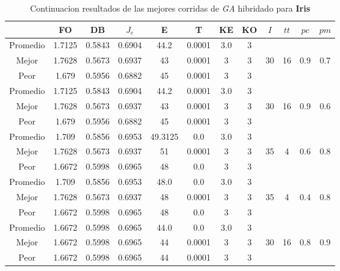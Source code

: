 \begin{table}[h!]
    \footnotesize
    \begin{center}
        \begin{tabular}{|c|c|c|c|c|c|c|c|c|c|c|c|}
        \hline
            & {\bf FO} & {\bf DB} & $J_e$ & {\bf E} & {\bf T} & {\bf KE} & {\bf KO} & $I$ & $tt$ & $pc$ & $pm$ \\
        \hline
        \hline
            Promedio  & 1.7125 & 0.5843 & 0.6904 & 44.2 & 0.0001 & 3.0 & 3 &  &  &  & \\
            \cline{1-8}
            Mejor & 1.7628 & 0.5673  & 0.6937 & 43 & 0.0001 & 3 & 3 & 30 & 16 & 0.9 & 0.7\\
            \cline{1-8}
            Peor & 1.679 & 0.5956  & 0.6882 & 45 & 0.0001 & 3 & 3 &  &  &  & \\
        \hline
        \hline
            Promedio  & 1.7125 & 0.5843 & 0.6904 & 44.2 & 0.0001 & 3.0 & 3 &  &  &  & \\
            \cline{1-8}
            Mejor & 1.7628 & 0.5673  & 0.6937 & 43 & 0.0001 & 3 & 3 & 30 & 16 & 0.9 & 0.6\\
            \cline{1-8}
            Peor & 1.679 & 0.5956  & 0.6882 & 45 & 0.0001 & 3 & 3 &  &  &  & \\
        \hline
        \hline
            Promedio  & 1.709 & 0.5856 & 0.6953 & 49.3125 & 0.0 & 3.0 & 3 &  &  &  & \\
            \cline{1-8}
            Mejor & 1.7628 & 0.5673  & 0.6937 & 51 & 0.0001 & 3 & 3 & 35 & 4 & 0.6 & 0.8\\
            \cline{1-8}
            Peor & 1.6672 & 0.5998  & 0.6965 & 48 & 0.0 & 3 & 3 &  &  &  & \\
        \hline
        \hline
            Promedio  & 1.709 & 0.5856 & 0.6953 & 48.0 & 0.0 & 3.0 & 3 &  &  &  & \\
            \cline{1-8}
            Mejor & 1.7628 & 0.5673  & 0.6937 & 48 & 0.0001 & 3 & 3 & 35 & 4 & 0.4 & 0.8\\
            \cline{1-8}
            Peor & 1.6672 & 0.5998  & 0.6965 & 48 & 0.0 & 3 & 3 &  &  &  & \\
        \hline
        \hline
            Promedio  & 1.6672 & 0.5998 & 0.6965 & 44.0 & 0.0 & 3.0 & 3 &  &  &  & \\
            \cline{1-8}
            Mejor & 1.6672 & 0.5998  & 0.6965 & 44 & 0.0001 & 3 & 3 & 30 & 16 & 0.8 & 0.9\\
            \cline{1-8}
            Peor & 1.6672 & 0.5998  & 0.6965 & 44 & 0.0001 & 3 & 3 &  &  &  & \\
        \hline
        \end{tabular}
        \caption{Continuacion resultados de las mejores corridas de \emph{GA} hibridado para {\bf Iris}}
        \label{tb:tablegahibcsvc}
    \end{center}
\end{table}
